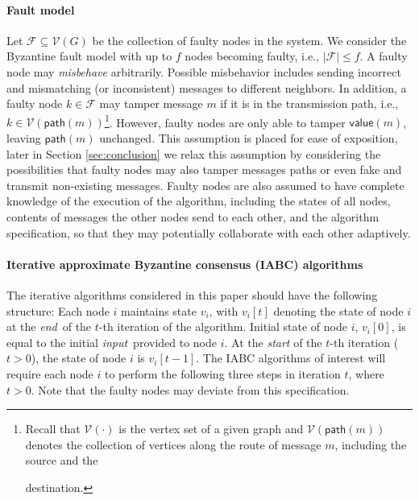 \documentclass[letterpaper, 11pt]{article}
\newcommand{\calF}{{\mathcal{F}}}
\newcommand{\calV}{{\mathcal{V}}}
\begin{document}
\paragraph{Fault model}
Let $\calF\subseteq \calV(G)$ be the collection of faulty nodes in the system. We consider the Byzantine fault model with up to $f$ nodes becoming faulty, i.e., $|\calF|\le f$.  A faulty node may {\em misbehave} arbitrarily. Possible misbehavior includes sending incorrect and mismatching (or inconsistent) messages to different neighbors. In addition, a faulty node $k\in \calF$ may tamper message $m$ if it is in the transmission path, i.e., $k\in \calV(\mathsf{path}(m))$\footnote{Recall that $\calV(\cdot)$ is the vertex set of a given graph and $\calV(\mathsf{path}(m))$ denotes the collection of vertices along the route of message $m$, including the source and the

  destination.}.
However, faulty nodes are only able to tamper $\mathsf{value}(m)$, leaving $\mathsf{path}(m)$ unchanged. This assumption is placed for ease of exposition, later in Section \ref{sec:conclusion} we relax this assumption by considering the possibilities that faulty nodes may also tamper messages paths or even fake and transmit non-existing messages.
Faulty nodes are also assumed to have complete knowledge of the execution of the algorithm, including the states of all nodes,
contents of messages the other nodes send to each other, and
the algorithm specification, so that they may potentially collaborate with each other adaptively.



\paragraph{Iterative approximate Byzantine consensus (IABC) algorithms}
\label{sec:iabc}

The iterative algorithms considered in this paper should have the following structure:
Each node $i$ maintains state $v_i$, with $v_i[t]$ denoting the state
of node $i$ at the {\em end}\, of the $t$-th iteration of the algorithm.
Initial state of node $i$,
$v_i[0]$, is equal to the initial {\em input}\, provided to node $i$.
At the {\em start} of the $t$-th iteration ($t>0$), the state of
node $i$ is $v_i[t-1]$.
The IABC algorithms of interest will require each node $i$
to perform the following three steps in iteration $t$, where $t>0$.
Note that the faulty nodes may deviate from this specification.
\end{document}
